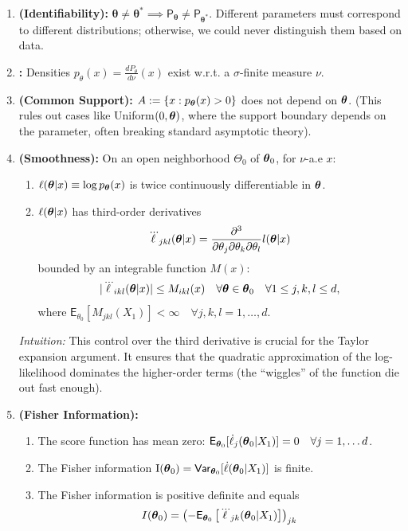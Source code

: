 \begin{enumerate}[label=\textbf{A\arabic*}, start=0]
    \item \textbf{(Identifiability):} \(\boldsymbol{\theta} \neq \boldsymbol{\theta}^* \implies \mathsf{P}_{\boldsymbol{\theta}} \neq \mathsf{P}_{\boldsymbol{\theta}^*}.\) Different parameters must correspond to different distributions; otherwise, we could never distinguish them based on data.
    \item \textbf{:} Densities \(p_{\theta}(x) = \frac{dP_{\theta}}{d\nu}(x)\) exist w.r.t. a \(\sigma\)-finite measure \(\nu\).
    \item \textbf{(Common Support):} \(A := \{x : p_{\boldsymbol{\theta}}(x) > 0\}\) does not depend on \(\boldsymbol{\theta}\). (This rules out cases like Uniform\((0, \boldsymbol{\theta})\), where the support boundary depends on the parameter, often breaking standard asymptotic theory).
    \item \textbf{(Smoothness):} On an open neighborhood \(\Theta_0\) of \(\boldsymbol{\theta}_0\), for \(\nu\)-a.e \(x\):
        \begin{enumerate}[label=\roman*)]
        \item \(\ell(\boldsymbol{\theta}|x) \equiv \log p_{\boldsymbol{\theta}}(x)\) is twice continuously differentiable in \(\boldsymbol{\theta}\).
        \item \(\ell(\boldsymbol{\theta}|x)\) has third-order derivatives 
        \[
            \dddot{\ell}_{jkl}(\boldsymbol{\theta}|x) = \frac{\partial ^3}{\partial \theta_{j} \partial \theta_{k}\partial\theta_{l}} 
            l(\boldsymbol{\theta}|x)
        \]
         bounded by an integrable function \(M(x)\):
        \[ |\dddot{\ell}_{ikl}(\boldsymbol{\boldsymbol{\theta}}|x)| \le M_{ikl}(x) \quad \forall \boldsymbol{\boldsymbol{\theta}} \in \boldsymbol{\theta}_0  \quad \forall 1\le j,k,l\le d,\]
        where \(\mathsf{E}_{\theta_0}\left[M_{jkl}(X_1)\right] <\infty \quad \forall j,k,l = 1,\dots ,d\).
    \end{enumerate}
    \textit{Intuition:} This control over the third derivative is crucial for the Taylor expansion argument. It ensures that the quadratic approximation of the log-likelihood dominates the higher-order terms (the ``wiggles'' of the function die out fast enough).
    \item \textbf{(Fisher Information):}
    \begin{enumerate}[label=\roman*)]
        \item The score function has mean zero: \(\mathsf{E}_{\boldsymbol{\boldsymbol{\theta}}_0}[\dot{\ell}_j(\boldsymbol{\boldsymbol{\theta}}_0|X_1)] = 0 \quad \forall j=1,\dots d\).
        \item The Fisher information \(\mathrm{I}(\boldsymbol{\theta}_0)=\mathsf{Var}_{\boldsymbol{\theta}_0}[\dot{\ell}(\boldsymbol{\theta}_0|X_1)]\) is finite.
        \item The Fisher information is positive definite and equals 
        \[
            I(\boldsymbol{\theta}_{0}) = \left(- \mathsf{E}_{\boldsymbol{\theta}_{0}}\left[\dddot{\ell}_{jk}(\boldsymbol{\theta}_{0}|X_1)\right] \right)_{jk}
        \]
        
    \end{enumerate}
\end{enumerate}

